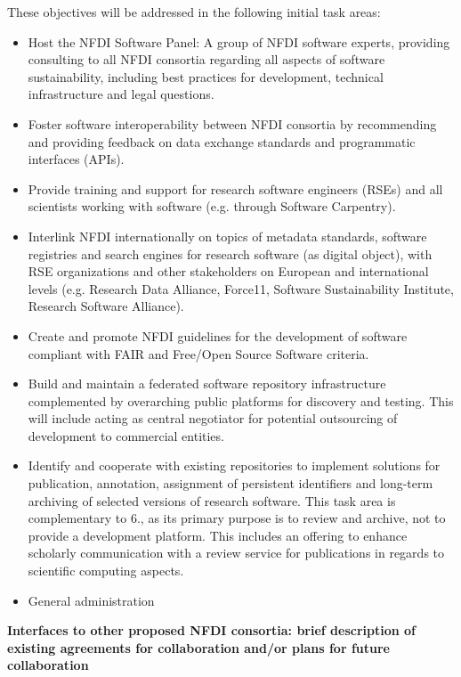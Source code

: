 \documentclass[11pt,a4paper,DIV=11]{scrlttr2}
\begin{document}
\begin{letter}{}
These objectives will be addressed in the following initial task areas:
\begin{itemize}
 \item Host the NFDI Software Panel: A group of NFDI software experts, providing consulting to all NFDI consortia regarding all aspects of software sustainability, including best practices for development, technical infrastructure and legal questions.
 \item Foster software interoperability between NFDI consortia by recommending and providing feedback on data exchange standards and programmatic interfaces (APIs).
 \item Provide training and support for research software engineers (RSEs) and all scientists  working with software (e.g. through Software Carpentry).
 \item Interlink NFDI internationally on topics of metadata standards, software registries and search engines for research software (as digital object), with RSE organizations and other stakeholders on European and international levels (e.g. Research Data Alliance, Force11, Software Sustainability Institute, Research Software Alliance).
 \item Create and promote NFDI guidelines for the development of software compliant with FAIR and Free/Open Source Software criteria.
 \item Build and maintain a federated software repository infrastructure complemented by overarching public platforms for discovery and testing. This will include acting as central negotiator for potential outsourcing of development to commercial entities.
 \item Identify and cooperate with existing repositories to implement solutions for publication, annotation, assignment of persistent identifiers and long-term archiving of selected versions of research software. This task area is complementary to 6., as its primary purpose is to review and archive, not to provide a development platform. This includes an offering to enhance scholarly communication with a review service for publications in regards to scientific computing aspects.
\item General administration
\end{itemize}

\clearpage
\textbf{Interfaces to other proposed NFDI consortia: brief description of existing agreements for collaboration and/or plans for future collaboration}\\


\end{letter}
\end{document}
